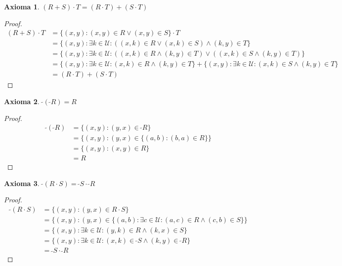 \documentclass{article}
\newtheorem*{axiom}{Axioma}
\newcommand{\U}{\mathcal{U}}
\newcommand{\conv}[1]{\ \tilde{}#1}
\begin{document}
\begin{axiom}
  $(R+S) \cdot T = (R \cdot T) + (S \cdot T)$
\end{axiom}
\begin{proof}
  \begin{equation*}
    \begin{aligned}
      (R+S) \cdot T &= \{(x, y) : (x, y) \in R \lor (x, y) \in S\} \cdot T \\ 
                    &= \{(x, y) : \exists k \in \U : ((x, k) \in R \lor (x, k) \in S) \land (k, y) \in T\} \\ 
                    &= \{(x, y) : \exists k \in \U : ((x, k) \in R \land (k, y) \in T) \lor ((x, k) \in S \land (k, y) \in T)\} \\ 
                    &= \{(x, y) : \exists k \in \U : (x, k) \in R \land (k, y) \in T\} + \{(x, y) : \exists k \in \U : (x, k) \in S \land (k, y) \in T\} \\ 
                    &= (R \cdot T) + (S \cdot T)
    \end{aligned}
  \end{equation*}
\end{proof}

\begin{axiom}
  $\conv{(\conv{R})} = R$
\end{axiom}
\begin{proof}
  \begin{equation*}
    \begin{aligned}
      \conv{(\conv{R})} &= \{(x, y) : (y, x) \in \conv{R}\} \\ 
                        &= \{(x, y) : (y, x) \in \{(a, b) : (b, a) \in R\}\} \\ 
                        &= \{(x, y) : (x, y) \in R\} \\ 
                        &= R
    \end{aligned}
  \end{equation*}
\end{proof}

\begin{axiom}
  $\conv{(R \cdot S)} = \conv{S} \cdot \conv{R}$
\end{axiom}
\begin{proof}
  \begin{equation*}
    \begin{aligned}
      \conv{(R \cdot S)} &= \{(x, y) : (y, x) \in R \cdot S\} \\ 
                         &= \{(x, y) : (y, x) \in \{(a, b) : \exists c \in \U : (a, c) \in R \land (c, b) \in S\}\} \\ 
                         &= \{(x, y) : \exists k \in \U : (y, k) \in R \land (k, x) \in S\} \\ 
                         &= \{(x, y) : \exists k \in \U : (x, k) \in \conv{S} \land (k, y) \in \conv{R}\} \\ 
                         &= \conv{S} \cdot \conv{R}
    \end{aligned}
  \end{equation*}
\end{proof}
\end{document}

